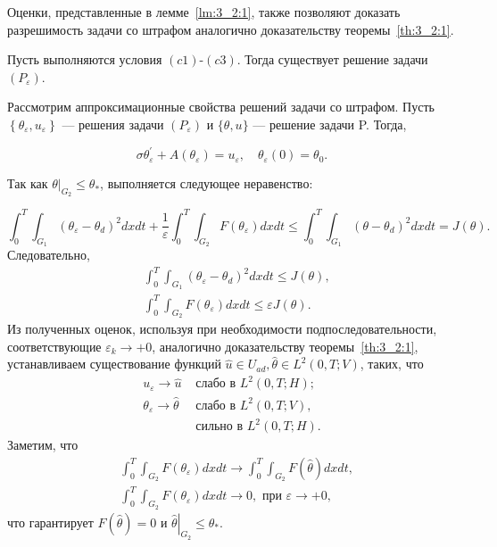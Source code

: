 Оценки, представленные в лемме~\ref{lm:3_2:1}, также позволяют доказать разрешимость
задачи со штрафом аналогично доказательству теоремы~\ref{th:3_2:1}.

\begin{theorem}
    \label{th:3_2:2}
    Пусть выполняются условия $(c1)$-$(c3)$.
    Тогда существует решение задачи $\left(P_{\varepsilon}\right)$.
\end{theorem}

Рассмотрим аппроксимационные свойства решений задачи со штрафом.
Пусть $\left\{\theta_{\varepsilon}, u_{\varepsilon}\right\}$ — решения задачи
$\left(P_{\varepsilon}\right)$ и $\{\theta, u\}$ — решение задачи P\@.
Тогда,

\begin{equation}
    \label{eq:3_2:8}
    \sigma \theta_{\varepsilon}^{\prime}
    +A\left(\theta_{\varepsilon}\right)=u_{\varepsilon},
    \quad \theta_{\varepsilon}(0)=\theta_{0}.
\end{equation}

Так как $\left.\theta\right|_{G_{2}} \leq \theta_{*}$, выполняется следующее неравенство:

\[
    \int_{0}^{T} \int_{G_{1}}\left(\theta_{\varepsilon}
    -\theta_{d}\right)^{2} d x d t+\frac{1}{\varepsilon}
    \int_{0}^{T} \int_{G_{2}}
    F\left(\theta_{\varepsilon}\right) d x d t
    \leq \int_{0}^{T} \int_{G_{1}}
    \left(\theta-\theta_{d}\right)^{2} d x d t=J(\theta).
\]
Следовательно,
\[
    \begin{aligned}
        &\int_{0}^{T} \int_{G_{1}}\left(\theta_{\varepsilon}
        -\theta_{d}\right)^{2} d x d t \leq J(\theta), \\
        &\int_{0}^{T} \int_{G_{2}} F
        \left(\theta_{\varepsilon}\right) d x d t \leq \varepsilon J(\theta).
    \end{aligned}
\]
Из полученных оценок, используя при необходимости подпоследовательности,
соответствующие $\varepsilon_{k} \rightarrow+0$,
аналогично доказательству теоремы~\ref{th:3_2:1}, устанавливаем существование
функций $\widehat{u} \in U_{a d}, \widehat{\theta} \in L^{2}(0, T ; V)$, таких, что
\[
    \begin{aligned}
        u_{\varepsilon}  \rightarrow \widehat{u} & \text { слабо в } L^{2}(0, T ; H); \\
        \theta_{\varepsilon}  \rightarrow \widehat{\theta} & \text { слабо в } L^{2}(0, T ; V), \\
        & \text { сильно в } L^{2}(0, T; H).
    \end{aligned}
\]
Заметим, что
\[
    \begin{aligned}
        &\int_{0}^{T} \int_{G_{2}} F\left(\theta_{\varepsilon}\right) d x d t
        \rightarrow \int_{0}^{T} \int_{G_{2}} F(\widehat{\theta}) d x d t, \\
        &\int_{0}^{T} \int_{G_{2}} F\left(\theta_{\varepsilon}\right) d x d t
        \rightarrow 0, \text { при } \varepsilon \rightarrow+0,
    \end{aligned}
\]
что гарантирует $F(\widehat{\theta})=0$ и
$\left.\widehat{\theta}\right|_{G_{2}} \leq \theta_{*}$.

